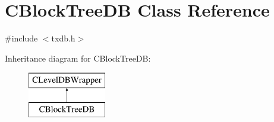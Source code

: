 \hypertarget{class_c_block_tree_d_b}{}\section{C\+Block\+Tree\+DB Class Reference}
\label{class_c_block_tree_d_b}


{\ttfamily \#include $<$txdb.\+h$>$}

Inheritance diagram for C\+Block\+Tree\+DB\+:\begin{figure}[H]
\begin{center}
\leavevmode
\includegraphics[height=2.000000cm]{class_c_block_tree_d_b}
\end{center}
\end{figure}
